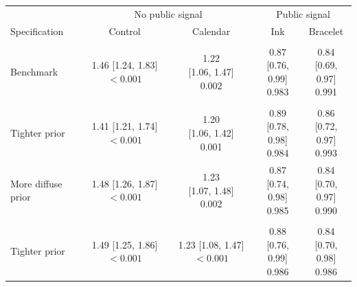 \centering
\begin{tabular}[t]{lcccc}
\toprule
\multicolumn{1}{c}{ } & \multicolumn{2}{c}{No public signal} & \multicolumn{2}{c}{Public signal} \\
\cmidrule(l{3pt}r{3pt}){2-3} \cmidrule(l{3pt}r{3pt}){4-5}
Specification & Control & Calendar & Ink & Bracelet\\
\midrule
\addlinespace[0.3em]
\multicolumn{5}{l}{\textit{Benchmark specification}}\\
\hspace{1em}Benchmark & \makecell[c]{1.46\\{[1.24, 1.83]}\\$<0.001$} & \makecell[c]{1.22\\{[1.06, 1.47]}\\0.002} & \makecell[c]{0.87\\{[0.76, 0.99]}\\0.983} & \makecell[c]{0.84\\{[0.69, 0.97]}\\0.991}\\
\addlinespace[0.3em]
\multicolumn{5}{l}{\textit{Social-image valuation ($\lambda$)}}\\
\hspace{1em}Tighter prior & \makecell[c]{1.41\\{[1.21, 1.74]}\\$<0.001$} & \makecell[c]{1.20\\{[1.06, 1.42]}\\0.001} & \makecell[c]{0.89\\{[0.78, 0.98]}\\0.984} & \makecell[c]{0.86\\{[0.72, 0.97]}\\0.993}\\
\hspace{1em}More diffuse prior & \makecell[c]{1.48\\{[1.26, 1.87]}\\$<0.001$} & \makecell[c]{1.23\\{[1.07, 1.48]}\\0.002} & \makecell[c]{0.87\\{[0.74, 0.98]}\\0.985} & \makecell[c]{0.84\\{[0.70, 0.97]}\\0.990}\\
\addlinespace[0.3em]
\multicolumn{5}{l}{\textit{Distance cost ($\delta$)}}\\
\hspace{1em}Tighter prior & \makecell[c]{1.49\\{[1.25, 1.86]}\\$<0.001$} & \makecell[c]{1.23\\{[1.08, 1.47]}\\$<0.001$} & \makecell[c]{0.88\\{[0.76, 0.99]}\\0.986} & \makecell[c]{0.84\\{[0.70, 0.98]}\\0.986}\\

\end{tabular}

